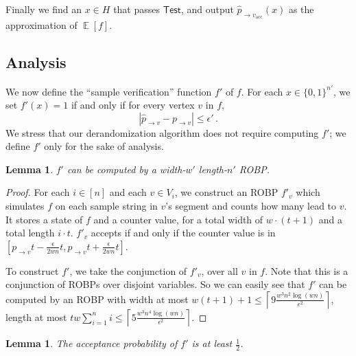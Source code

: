 \documentclass[11pt]{article}
\numberwithin{equation}{section}
\newtheorem{lemma}[theorem]{Lemma}
\theoremstyle{definition}
\theoremstyle{plain}
\DeclareMathOperator*{\ExpVal}{\mathbb{E}}
\begin{document}
Finally we find an $x \in H$ that passes $\mathsf{Test}$, and output $\widehat{p}_{\rightarrow v_{\text{acc}}}(x)$ as the approximation of $\ExpVal[f]$.

\subsection{Analysis}

We now define the ``sample verification'' function $f'$ of $f$. For each $x \in \{0, 1\}^{n'}$, we set $f'(x) = 1$ if and only if for every vertex $v$ in $f$,
\begin{equation}
\label{ieq:prhoClose}
\left| \widehat{p}_{\to v} - p_{\to v} \right| \leq   \epsilon'\,. 
\end{equation}
We stress that our derandomization algorithm does not require computing $f'$; we define $f'$ only for the sake of analysis.

\begin{lemma} \label{lem:upgradeROBP}
$f'$ can be computed by a width-$w'$ length-$n'$ ROBP.
\end{lemma}

\begin{proof}
For each $i \in [n]$ and each $v \in V_i$, we construct an ROBP $f'_v$ which simulates $f$ on each sample string in $v$'s segment and counts how many lead to $v$. It stores a state of $f$ and a counter value, for a total width of $w \cdot (t + 1)$ and a total length $i \cdot t$. $f'_v$ accepts if and only if the counter value is in $[p_{\to v}t -\frac{\epsilon}{2wn}t , p_{\to v}t+ \frac{\epsilon}{2wn}t] $.

To construct $f'$, we take the conjunction of $f'_v$, over all $v$ in $f$. Note that this is a conjunction of ROBPs over disjoint variables. So we can easily see that $f'$ can be computed by an  ROBP with width at most $w (t+1) + 1 \leq \left \lceil 9\frac{w^3n^2 \log (wn) }{\epsilon^2} \right \rceil$, length at most $t w \sum_{i=1}^{n } i   \leq \left \lceil 5 \frac{w^3n^4  \log (wn) }{\epsilon^2} \right \rceil$.
\end{proof}

\begin{lemma} \label{lem:acceptProbofUpgradedROBP}
The acceptance probability of $f'$ is at least $\frac{1}{2}$.
\end{lemma}
\end{document}
